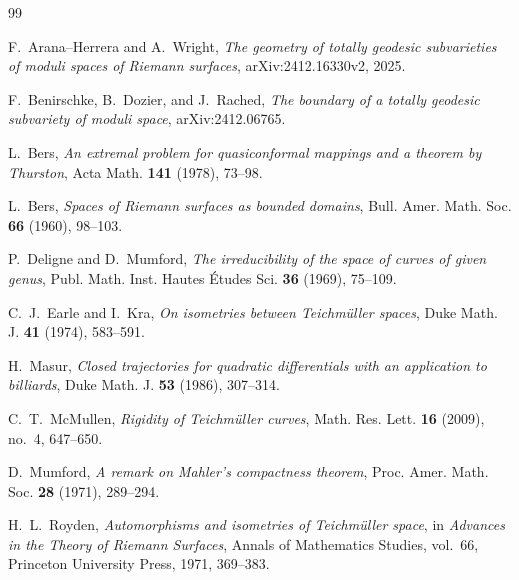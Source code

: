 \documentclass[11pt]{article}
\theoremstyle{remark}
\begin{document}
\begin{thebibliography}{99}

F.~Arana--Herrera and A.~Wright,
\emph{The geometry of totally geodesic subvarieties of moduli
spaces of Riemann surfaces},
arXiv:2412.16330v2, 2025.

F.~Benirschke, B.~Dozier, and J.~Rached,
\emph{The boundary of a totally geodesic subvariety of moduli
space},
arXiv:2412.06765.

L.~Bers,
\emph{An extremal problem for quasiconformal mappings and a
theorem by Thurston},
Acta Math. \textbf{141} (1978), 73--98.

L.~Bers,
\emph{Spaces of Riemann surfaces as bounded domains},
Bull. Amer. Math. Soc. \textbf{66} (1960), 98--103.

P.~Deligne and D.~Mumford,
\emph{The irreducibility of the space of curves of given genus},
Publ. Math. Inst. Hautes \'Etudes Sci. \textbf{36} (1969),
75--109.

C.~J.~Earle and I.~Kra,
\emph{On isometries between Teichm\"uller spaces},
Duke Math. J. \textbf{41} (1974), 583--591.

H.~Masur,
\emph{Closed trajectories for quadratic differentials with an
application to billiards},
Duke Math. J. \textbf{53} (1986), 307--314.

C.~T.~McMullen,
\emph{Rigidity of Teichm\"uller curves},
Math. Res. Lett. \textbf{16} (2009), no.~4, 647--650.

D.~Mumford,
\emph{A remark on Mahler's compactness theorem},
Proc. Amer. Math. Soc. \textbf{28} (1971), 289--294.

H.~L.~Royden,
\emph{Automorphisms and isometries of Teichm\"uller space},
in \emph{Advances in the Theory of Riemann Surfaces},
Annals of Mathematics Studies, vol.~66,
Princeton University Press, 1971, 369--383.

\end{thebibliography}
\end{document}
